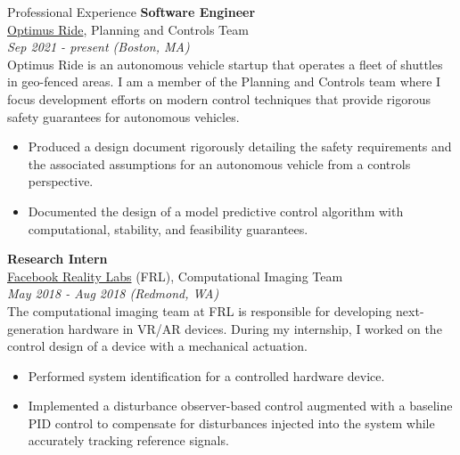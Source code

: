 \documentclass[9pt]{article}
\begin{document}
\begin{rsection}{Professional Experience}
    \textbf{Software Engineer} \\
    \href{https://www.optimusride.com/}{Optimus Ride}, Planning and Controls Team \\
    \textit{Sep 2021 - present (Boston, MA)}
    \vspace{0.5em} \\
    Optimus Ride is an autonomous vehicle startup that operates a fleet of shuttles in geo-fenced areas. I am a member of the Planning and Controls team where I focus development efforts on modern control techniques that provide rigorous safety guarantees for autonomous vehicles.
    \begin{itemize}
        \item Produced a design document rigorously detailing the safety requirements and the associated assumptions for an autonomous vehicle from a controls perspective.
        \item Documented the design of a model predictive control algorithm with computational, stability, and feasibility guarantees.
    \end{itemize}
    
    \textbf{Research Intern} \\
    \href{https://about.facebook.com/realitylabs/}{Facebook Reality Labs} (FRL), Computational Imaging Team \\
    \textit{May 2018 - Aug 2018 (Redmond, WA)}
    \vspace{0.5em} \\
    The computational imaging team at FRL is responsible for developing next-generation hardware in VR/AR devices. During my internship, I worked on the control design of a device with a mechanical actuation.
    \begin{itemize}
        \item Performed system identification for a controlled hardware device.
        \item Implemented a disturbance observer-based control augmented with a baseline PID control to compensate for disturbances injected into the system while accurately tracking reference signals.
    \end{itemize}
    

\end{rsection}
\end{document}
